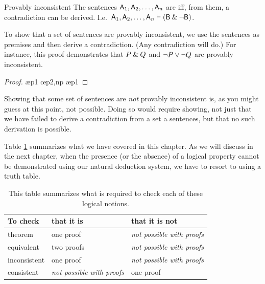 \begin{factboxy}{Provably inconsistent}
The sentences $\mathsf{A}_1,\mathsf{A}_2,\ldots, \mathsf{A}_n$ are  iff, from them, a contradiction can be derived. I.e.\ $\mathsf{A}_1,\mathsf{A}_2,\ldots, \mathsf{A}_n \vdash (\mathsf{B} \mathbin{\&} {\neg} \mathsf{B})$.
\end{factboxy}
        
To show that a set of sentences are provably inconsistent, we use the sentences as premises and then derive a contradiction. (Any contradiction will do.) For instance, this proof demonstrates that $P \mathbin{\&} Q$ and ${\neg} P \vee {\neg} Q$ are provably inconsistent.

	\begin{proof}
	 \pr{}
	 \pr{}
	 \ae{p1}
	 
	 \oe{p2,np}
	 \ae{p1}
	\end{proof}

Showing that some set of sentences are \textit{not} provably inconsistent is, as you might guess at this point, not possible. Doing so would require showing, not just that we have failed to derive a contradiction from a set a sentences, but that no such derivation is possible.

Table \ref{table.one-mult-proofs} summarizes what we have covered in this chapter. As we will discuss in the next chapter, when the presence (or the absence) of a logical property cannot be demonstrated using our natural deduction system, we have to resort to using a truth table.

\begin{table}\centering\sffamily\footnotesize
{}
\begin{tabular}{@{}l l l@{}}\toprule
To check & that it is & that it is not\\\midrule
theorem & one proof & \textit{not possible with proofs}\\
equivalent & two proofs & \textit{not possible with proofs}\\
inconsistent &  one proof  & \textit{not possible with proofs}\\
consistent & \textit{not possible with proofs} & one proof\\
\bottomrule
\end{tabular}
\caption{This table summarizes what is required to check each of these logical notions.}\label{table.one-mult-proofs}
\end{table}


